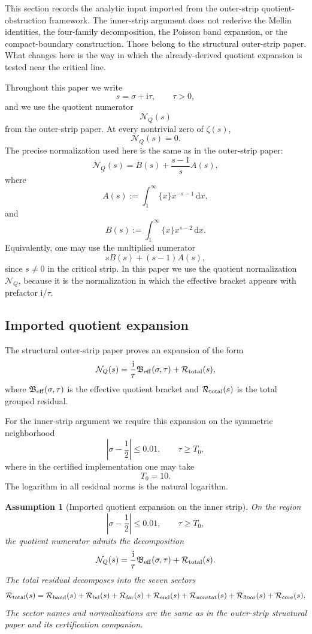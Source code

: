 \documentclass[11pt]{article}
\newtheorem{assumption}[theorem]{Assumption}
\newcommand{\ii}{\mathrm{i}}
\newcommand{\dd}{\,\mathrm{d}}
\newcommand{\NQ}{\mathcal N_Q}
\newcommand{\Rtot}{\mathcal R_{\rm total}}
\newcommand{\Beff}{\mathfrak B_{\rm eff}}
\begin{document}
This section records the analytic input imported from the outer-strip
quotient-obstruction framework.  The inner-strip argument does not rederive the
Mellin identities, the four-family decomposition, the Poisson band expansion,
or the compact-boundary construction.  Those belong to the structural
outer-strip paper.  What changes here is the way in which the already-derived
quotient expansion is tested near the critical line.

Throughout this paper we write
\[
        s=\sigma+\ii\tau,
        \qquad
        \tau>0,
\]
and we use the quotient numerator
\[
        \NQ(s)
\]
from the outer-strip paper.  At every nontrivial zero of \(\zeta(s)\),
\[
        \NQ(s)=0.
\]
The precise normalization used here is the same as in the outer-strip paper:
\[
        \NQ(s)
        =
        B(s)+\frac{s-1}{s}A(s),
\]
where
\[
        A(s):=\int_1^\infty \{x\}x^{-s-1}\dd x,
\]
and
\[
        B(s):=\int_1^\infty \{x\}x^{s-2}\dd x.
\]
Equivalently, one may use the multiplied numerator
\[
        sB(s)+(s-1)A(s),
\]
since \(s\ne0\) in the critical strip.  In this paper we use the quotient
normalization \(\NQ\), because it is the normalization in which the effective
bracket appears with prefactor \(\ii/\tau\).

\subsection{Imported quotient expansion}

The structural outer-strip paper proves an expansion of the form
\[
        \NQ(s)
        =
        \frac{\ii}{\tau}\Beff(\sigma,\tau)
        +
        \Rtot(s),
\]
where \(\Beff(\sigma,\tau)\) is the effective quotient bracket and
\(\Rtot(s)\) is the total grouped residual.

For the inner-strip argument we require this expansion on the symmetric
neighborhood
\[
        \left|\sigma-\frac12\right|\le0.01,
        \qquad
        \tau\ge T_0,
\]
where in the certified implementation one may take
\[
        T_0=10.
\]
The logarithm in all residual norms is the natural logarithm.

\begin{assumption}[Imported quotient expansion on the inner strip]
\label{ass:inner-quotient-expansion}
On the region
\[
        \left|\sigma-\frac12\right|\le0.01,
        \qquad
        \tau\ge T_0,
\]
the quotient numerator admits the decomposition
\[
        \NQ(s)
        =
        \frac{\ii}{\tau}\Beff(\sigma,\tau)
        +
        \Rtot(s).
\]
The total residual decomposes into the seven sectors
\[
        \Rtot(s)
        =
        \mathcal R_{\rm band}(s)
        +
        \mathcal R_{\rm bd}(s)
        +
        \mathcal R_{\rm far}(s)
        +
        \mathcal R_{\rm end}(s)
        +
        \mathcal R_{\rm nonstat}(s)
        +
        \mathcal R_{\rm floor}(s)
        +
        \mathcal R_{\rm core}(s).
\]
The sector names and normalizations are the same as in the outer-strip
structural paper and its certification companion.
\end{assumption}
\end{document}
